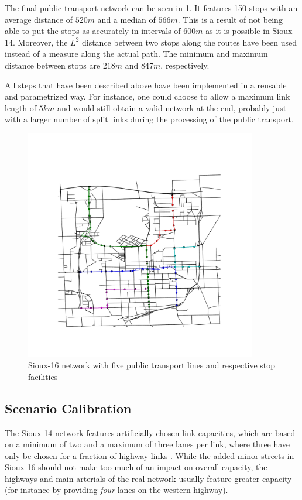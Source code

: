 The final public transport network can be seen in \cref{fig:pt_network}. It features
150 stops with an average distance of $520m$ and a median of $566m$. This is a
result of not being able to put the stops as accurately in intervals of $600m$
as it is possible in Sioux-14. Moreover, the $L^2$ distance between two stops along
the routes have been used instead of a measure along the actual path. The minimum
and maximum distance between stops are $218m$ and $847m$, respectively.

All steps that have been described above have been implemented in a reusable and
parametrized way. For instance, one could choose to allow a maximum link length of
$5km$ and would still obtain a valid network at the end, probably just with a larger
number of split links during the processing of the public transport.

\begin{figure}[h]
    \centering
    \includegraphics[width=0.9\textwidth]{figures/pt_network.pdf}
    \caption{Sioux-16 network with five public transport lines and respective stop
    facilities}
    \label{fig:pt_network}
\end{figure}

\subsection{Scenario Calibration}

The Sioux-14 network features artificially chosen link capacities, which are based
on a minimum of two and a maximum of three lanes per link, where three have only
be chosen for a fraction of highway links \citep{Chakirov2014}. While the added
minor streets in Sioux-16 should not make too much of an impact on overall
capacity, the highways and main arterials of the real network usually feature
greater capacity (for instance by providing \textit{four} lanes on the western highway).

